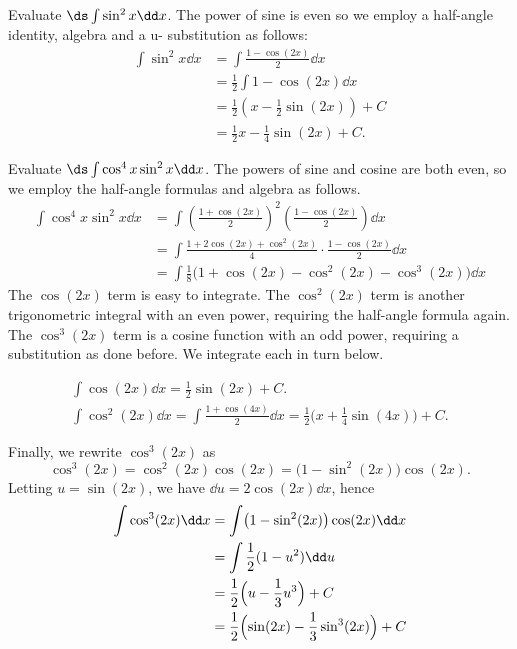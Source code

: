 
\begin{example}\label{ex_sub8}%
Evaluate $\ds \int \sin^2x\dd x$.
\solution
The power of sine is even so we employ a half-angle identity, algebra and a u- substitution as follows:
\begin{align*}
	\int \sin^2x\dd x
	&= \int \frac{1-\cos(2x)}2\dd x \\
	&= \frac12\int 1-\cos(2x)\dd x \\
	&= \frac12\left(x - \frac12\sin(2x)\right)+C \\
	&= \frac12x - \frac14\sin(2x) + C.
\end{align*}
\end{example}

\begin{example}\label{ex_trigint3}%
Evaluate $\ds\int\cos^4x\sin^2x\dd x$.
\solution
The powers of sine and cosine are both even, so we employ the half-angle formulas and algebra as follows.
\begin{align*}
	\int \cos^4x\sin^2x\dd x
	&= \int\left(\frac{1+\cos(2x)}{2}\right)^2\left(\frac{1-\cos(2x)}2\right)\dd x \\
	&= \int\frac{1+2\cos(2x)+\cos^2(2x)}4\cdot\frac{1-\cos(2x)}2\dd x\\
	&=	\int \frac18\bigl(1+\cos(2x)-\cos^2(2x)-\cos^3(2x)\bigr)\dd x
\end{align*}
The $\cos(2x)$ term is easy to integrate.
The $\cos^2(2x)$ term is another trigonometric integral with an even power, requiring the half-angle formula again. The $\cos^3(2x)$ term is a cosine function with an odd power, requiring a substitution as done before. We integrate each in turn below.

\begin{gather*}
\int\cos(2x)\dd x = \frac12\sin(2x)+C.\\
\int\cos^2(2x)\dd x = \int \frac{1+\cos(4x)}2\dd x
= \frac12\bigl(x+\frac14\sin(4x)\bigr)+C.
\end{gather*}

Finally, we rewrite $\cos^3(2x)$ as
\[\cos^3(2x) = \cos^2(2x)\cos(2x) = \bigl(1-\sin^2(2x)\bigr)\cos(2x).\]
Letting $u=\sin(2x)$, we have $\dd u = 2\cos(2x)\dd x$, hence
\begin{align*}
\int \cos^3(2x)\dd x &= \int\bigl(1-\sin^2(2x)\bigr)\cos(2x)\dd x\\
							&= \int \frac12(1-u^2)\dd u\\
							&= \frac12\Bigl(u-\frac13u^3\Bigr)+C\\
							&=	\frac12\Bigl(\sin(2x)-\frac13\sin^3(2x)\Bigr)+C
\end{align*}


\end{example}
